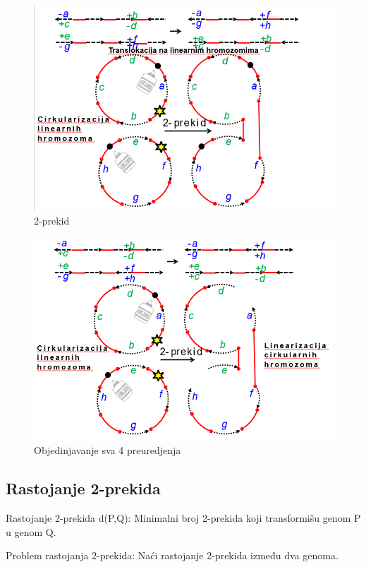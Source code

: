 \begin{figure}[h]
\centering
\includegraphics[scale=0.6]{poglavlja/6/slike/2_prekid_1.PNG}
\caption{2-prekid}
\label{slika:X}
\end{figure}

\newpage
\begin{figure}[h]
\centering
\includegraphics[scale=0.6]{poglavlja/6/slike/2_prekid_2.PNG}
\caption{Objedinjavanje sva 4 preuredjenja}
\label{slika:X}
\end{figure}

\subsection{Rastojanje 2-prekida}

\begin{definicija} {Rastojanje 2-prekida d(P,Q): Minimalni broj 2-prekida koji transformišu genom P u genom Q.}
\end{definicija}
\begin{definicija} {Problem rastojanja 2-prekida: Naći rastojanje 2-prekida između dva genoma.}
\end{definicija}

